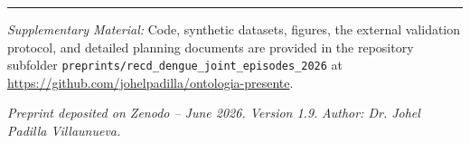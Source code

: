 \documentclass[11pt,a4paper]{article}
\begin{document}
\vspace{0.6em}
\hrule
\vspace{0.5em}
\begin{sloppypar}
\noindent\textit{Supplementary Material:} Code, synthetic datasets, figures, the external validation protocol, and detailed planning documents are provided in the repository subfolder \texttt{preprints/recd\_dengue\_joint\_episodes\_2026} at \url{https://github.com/johelpadilla/ontologia-presente}.
\end{sloppypar}

\vspace{0.6em}
\noindent\textit{Preprint deposited on Zenodo – June 2026. Version 1.9.}  
\noindent\textit{Author: Dr. Johel Padilla Villaunueva.}
\end{document}
